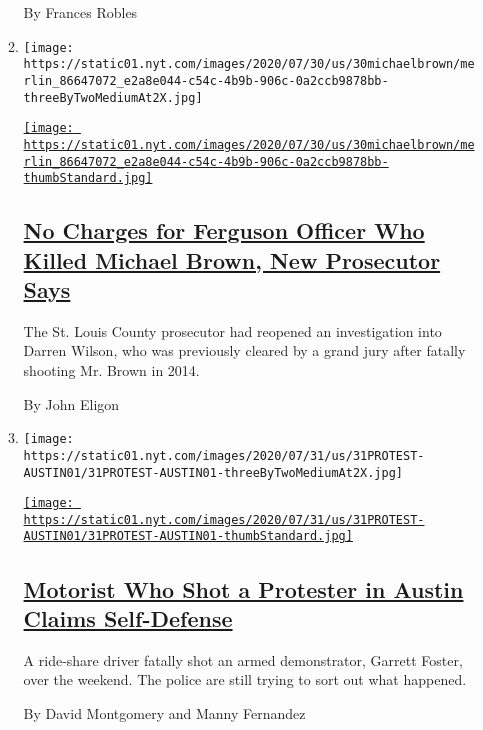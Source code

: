 \begin{enumerate}
\begin{enumerate}
    By Frances Robles
  \item
    \texttt{[image: https://static01.nyt.com/images/2020/07/30/us/30michaelbrown/merlin\_86647072\_e2a8e044-c54c-4b9b-906c-0a2ccb9878bb-threeByTwoMediumAt2X.jpg]}

    \href{/2020/07/30/us/michael-brown-darren-wilson-ferguson.html}{\texttt{[image: https://static01.nyt.com/images/2020/07/30/us/30michaelbrown/merlin\_86647072\_e2a8e044-c54c-4b9b-906c-0a2ccb9878bb-thumbStandard.jpg]}}

    \hypertarget{no-charges-for-ferguson-officer-who-killed-michael-brown-new-prosecutor-says}{%
    \subsection{\texorpdfstring{\href{/2020/07/30/us/michael-brown-darren-wilson-ferguson.html}{No
    Charges for Ferguson Officer Who Killed Michael Brown, New
    Prosecutor
    Says}}{No Charges for Ferguson Officer Who Killed Michael Brown, New Prosecutor Says}}\label{no-charges-for-ferguson-officer-who-killed-michael-brown-new-prosecutor-says}}

    The St. Louis County prosecutor had reopened an investigation into
    Darren Wilson, who was previously cleared by a grand jury after
    fatally shooting Mr. Brown in 2014.

    By John Eligon
  \item
    \texttt{[image: https://static01.nyt.com/images/2020/07/31/us/31PROTEST-AUSTIN01/31PROTEST-AUSTIN01-threeByTwoMediumAt2X.jpg]}

    \href{/2020/07/31/us/austin-protest-shooting-foster-perry.html}{\texttt{[image: https://static01.nyt.com/images/2020/07/31/us/31PROTEST-AUSTIN01/31PROTEST-AUSTIN01-thumbStandard.jpg]}}

    \hypertarget{motorist-who-shot-a-protester-in-austin-claims-self-defense}{%
    \subsection{\texorpdfstring{\href{/2020/07/31/us/austin-protest-shooting-foster-perry.html}{Motorist
    Who Shot a Protester in Austin Claims
    Self-Defense}}{Motorist Who Shot a Protester in Austin Claims Self-Defense}}\label{motorist-who-shot-a-protester-in-austin-claims-self-defense}}

    A ride-share driver fatally shot an armed demonstrator, Garrett
    Foster, over the weekend. The police are still trying to sort out
    what happened.

    By David Montgomery and Manny Fernandez
  \end{enumerate}
\end{enumerate}


